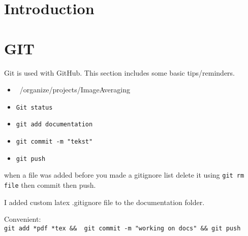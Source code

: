 \documentclass[10pt,a4paper]{report}
\author{Jeroen Keizer}
\begin{document}
\section{Introduction}
\section{GIT}
Git is used with GitHub.
This section includes some basic tips/reminders.
\begin{itemize}
\item ~/organize/projects/ImageAveraging
\item \verb|Git status|
\item \verb|git add documentation|
\item \verb|git commit -m "tekst"|
\item \verb|git push|
\end{itemize}
when a file was added before you made a gitignore list delete it using \verb|git rm file| then commit then push.

I added custom latex .gitignore file to the documentation folder.

Convenient:\\
\verb|git add *pdf *tex &&  git commit -m "working on docs" && git push|
\end{document}
